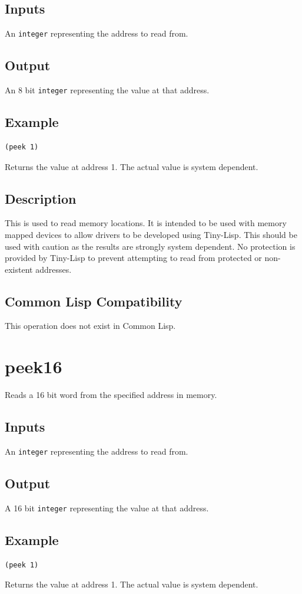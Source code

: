 \documentclass[10pt, openany]{book}
\newcommand{\datatype}[1]{\texttt{#1}}
\newcommand{\tl}{Tiny-Lisp}
\newcommand{\cl}{Common Lisp}
\begin{document}
\subsection{Inputs}
An \datatype{integer} representing the address to read from.
\subsection{Output}
An 8 bit \datatype{integer} representing the value at that address.
\subsection{Example}
\begin{lstlisting}
(peek 1)
\end{lstlisting}
Returns the value at address 1.  The actual value is system dependent.
\subsection{Description}
This is used to read memory locations.  It is intended to be used with memory mapped devices to allow drivers to be developed using \tl{}.  This should be used with caution as the results are strongly system dependent.  No protection is provided by \tl{} to prevent attempting to read from protected or non-existent addresses.
\subsection{Common Lisp Compatibility}
This operation does not exist in \cl.

\section{peek16}
Reads a 16 bit word from the specified address in memory.
\subsection{Inputs}
An \datatype{integer} representing the address to read from.
\subsection{Output}
A 16 bit \datatype{integer} representing the value at that address.
\subsection{Example}
\begin{lstlisting}
(peek 1)
\end{lstlisting}
Returns the value at address 1.  The actual value is system dependent.
\end{document}
